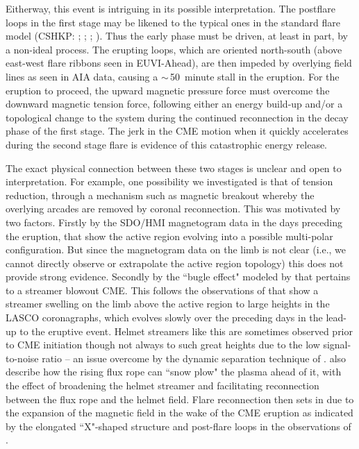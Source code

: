 \documentclass[namedreferences]{solarphysics}
\begin{document}
\begin{article}
{%

Eitherway, this event is intriguing in its possible interpretation. The postflare loops in the first stage may be likened to the typical ones in the standard flare model (CSHKP: ; ; ; ). Thus the early phase must be driven, at least in part, by a non-ideal process. The erupting loops, which are oriented north-south (above east-west flare ribbons seen in EUVI-Ahead), are then impeded by overlying field lines as seen in AIA data, causing a $\sim$\,50~minute stall in the eruption. For the eruption to proceed, the upward magnetic pressure force must overcome the downward magnetic tension force, following either an energy build-up and/or a topological change to the system during the continued reconnection in the decay phase of the first stage. The jerk in the CME motion when it quickly accelerates during the second stage flare is evidence of this catastrophic energy release.

The exact physical connection between these two stages is unclear and open to interpretation. For example, one possibility we investigated is that of tension reduction, through a mechanism such as magnetic breakout whereby the overlying arcades are removed by coronal reconnection. This was motivated by two factors. Firstly by the SDO/HMI magnetogram data in the days preceding the eruption, that show the active region evolving into a possible multi-polar configuration. But since the magnetogram data on the limb is not clear (i.e., we cannot directly observe or extrapolate the active region topology) this does not provide strong evidence. Secondly by the ``bugle effect" modeled by  that pertains to a streamer blowout CME. This follows the observations of  that show a streamer swelling on the limb above the active region to large heights in the LASCO coronagraphs, which evolves slowly over the preceding days in the lead-up to the eruptive event. Helmet streamers like this are sometimes observed prior to CME initiation \cite{1993JGR....9813177H} though not always to such great heights due to the low signal-to-noise ratio -- an issue overcome by the dynamic separation technique of .  also describe how the rising flux rope can ``snow plow" the plasma ahead of it, with the effect of broadening the helmet streamer and facilitating reconnection between the flux rope and the helmet field. Flare reconnection then sets in due to the expansion of the magnetic field in the wake of the CME eruption as indicated by the elongated ``X"-shaped structure and post-flare loops in the observations of .

}
\end{article}
\end{document}
